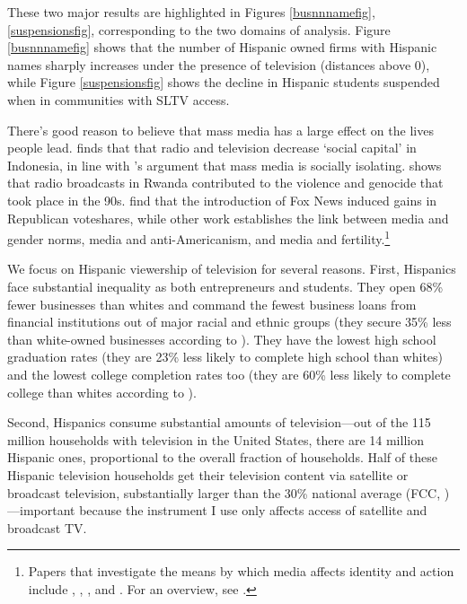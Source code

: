 \documentclass[11pt]{article}
\begin{document}
These two major results are highlighted in Figures \ref{busnnnamefig}, \ref{suspensionsfig}, corresponding to the two domains of analysis. Figure \ref{busnnnamefig} shows that the number of Hispanic owned firms with Hispanic names sharply increases under the presence of television (distances above $0$), while Figure \ref{suspensionsfig} shows the decline in Hispanic students suspended when in communities with SLTV access.

There's good reason to believe that mass media has a large effect on the lives people lead. \cite{olken_television_2009} finds that that radio and television decrease `social capital' in Indonesia, in line with \cite{putnam_bowling_2001}'s argument that mass media is socially isolating. \cite{yanagizawa-drott_propaganda_2014} shows that radio broadcasts in Rwanda contributed to the violence and genocide that took place in the 90s. \cite{dellavigna_fox_2007} find that the introduction of Fox News induced gains in Republican voteshares, while other work establishes the link between media and gender norms, media and anti-Americanism, and media and fertility.\footnote{ Papers that investigate the means by which media affects identity and action include \cite{jensen_power_2009}, \cite{gentzkow_media_2004}, \cite{ferrara_soap_2012}, and \cite{kearney_media_2015}. For an overview, see \cite{dellavigna_economic_2015}.}

We focus on Hispanic viewership of television for several reasons. First, Hispanics face substantial inequality as both entrepreneurs and students. They open 68\% fewer businesses than whites and command the fewest business loans from financial institutions out of major racial and ethnic groups (they secure 35\% less than white-owned businesses according to \cite{orozco_state_2017}). They have the lowest high school graduation rates (they are 23\% less likely to complete high school than whites) and the lowest college completion rates too (they are 60\% less likely to complete college than whites according to \cite{tienda_hispanicity_2009}).  

Second, Hispanics consume substantial amounts of television---out of the 115 million households with television in the United States, there are 14 million Hispanic ones, proportional to the overall fraction of households. Half of these Hispanic television households get their television content via satellite or broadcast television, substantially larger than the 30\% national average (FCC\cite{noauthor_hispanic_2016}, \cite{de_la_merced_att_2014})---important because the instrument I use only affects access of satellite and broadcast TV.
\end{document}
